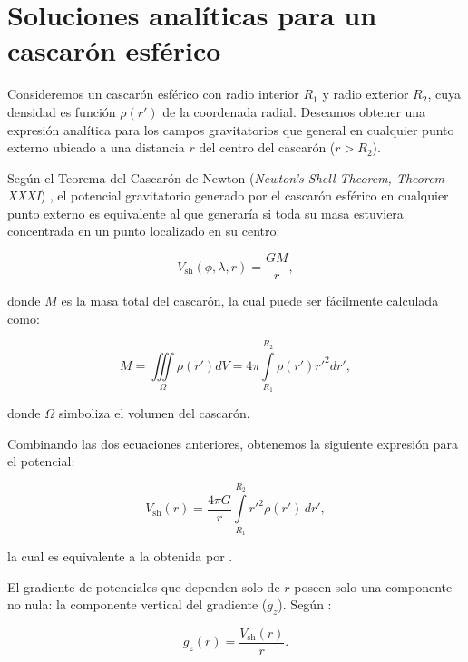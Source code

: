 \chapter{Soluciones analíticas para un cascarón esférico}
\label{cha:shell}

Consideremos un cascarón esférico con radio interior $R_1$ y radio exterior
$R_2$, cuya densidad es función $\rho(r')$ de la coordenada radial.
Deseamos obtener una expresión analítica para los campos gravitatorios que
general en cualquier punto externo ubicado a una distancia $r$ del centro del
cascarón ($r > R_2$).

Según el Teorema del Cascarón de Newton (\emph{Newton's Shell Theorem, Theorem
XXXI}) \citep{chandrasekhar1995, binney2008}, el potencial gravitatorio
generado por el cascarón esférico en cualquier punto externo es equivalente
al que generaría si toda su masa estuviera concentrada en un punto localizado
en su centro:

\begin{equation}
    V_\text{sh}(\phi, \lambda, r) = \frac{GM}{r},
\end{equation}

\noindent donde $M$ es la masa total del cascarón, la cual puede ser fácilmente
calculada como:

\begin{equation}
    M =
    \iiint\limits_{\Omega} \rho(r') dV =
    4\pi \int\limits_{R_1}^{R_2} \rho(r') {r'}^2 dr',
\end{equation}

\noindent donde $\Omega$ simboliza el volumen del cascarón.

Combinando las dos ecuaciones anteriores, obtenemos la siguiente expresión para
el potencial:

\begin{equation}
    V_\text{sh}(r) = \frac{4\pi G}{r}
    \int\limits_{R_1}^{R_2} {r'}^2 \rho(r') \, dr',
\label{eq:shell-pot}
\end{equation}

\noindent la cual es equivalente a la obtenida por \citet[p.62]{binney2008}.

El gradiente de potenciales que dependen solo de $r$ poseen solo una componente
no nula: la componente vertical del gradiente ($g_z$).
Según \citet{grombein2013}:

\begin{equation}
    g_z(r) = \frac{V_\text{sh}(r)}{r}.
\label{eq:shell-gz}
\end{equation}

